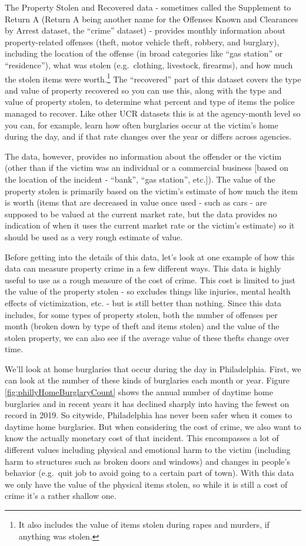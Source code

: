 \documentclass[
  12pt,
  openany]{book}
\begin{document}
The Property Stolen and Recovered data - sometimes called the Supplement to Return A (Return A being another name for the Offenses Known and Clearances by Arrest dataset, the ``crime'' dataset) - provides monthly information about property-related offenses (theft, motor vehicle theft, robbery, and burglary), including the location of the offense (in broad categories like ``gas station'' or ``residence''), what was stolen (e.g.~clothing, livestock, firearms), and how much the stolen items were worth.\footnote{It also includes the value of items stolen during rapes and murders, if anything was stolen.} The ``recovered'' part of this dataset covers the type and value of property recovered so you can use this, along with the type and value of property stolen, to determine what percent and type of items the police managed to recover. Like other UCR datasets this is at the agency-month level so you can, for example, learn how often burglaries occur at the victim's home during the day, and if that rate changes over the year or differs across agencies.

The data, however, provides no information about the offender or the victim (other than if the victim was an individual or a commercial business {[}based on the location of the incident - ``bank'', ``gas station'', etc.{]}). The value of the property stolen is primarily based on the victim's estimate of how much the item is worth (items that are decreased in value once used - such as cars - are supposed to be valued at the current market rate, but the data provides no indication of when it uses the current market rate or the victim's estimate) so it should be used as a very rough estimate of value.

Before getting into the details of this data, let's look at one example of how this data can measure property crime in a few different ways. This data is highly useful to use as a rough measure of the cost of crime. This cost is limited to just the value of the property stolen - so excludes things like injuries, mental health effects of victimization, etc. - but is still better than nothing. Since this data includes, for some types of property stolen, both the number of offenses per month (broken down by type of theft and items stolen) and the value of the stolen property, we can also see if the average value of these thefts change over time.

We'll look at home burglaries that occur during the day in Philadelphia. First, we can look at the number of these kinds of burglaries each month or year. Figure \ref{fig:phillyHomeBurglaryCount} shows the annual number of daytime home burglaries and in recent years it has declined sharply into having the fewest on record in 2019. So citywide, Philadelphia has never been safer when it comes to daytime home burglaries. But when considering the cost of crime, we also want to know the actually monetary cost of that incident. This encompasses a lot of different values including physical and emotional harm to the victim (including harm to structures such as broken doors and windows) and changes in people's behavior (e.g.~quit job to avoid going to a certain part of town). With this data we only have the value of the physical items stolen, so while it is still a cost of crime it's a rather shallow one.
\end{document}
